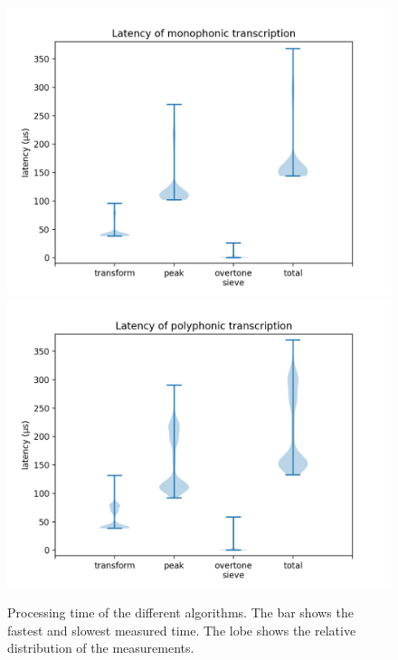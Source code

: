 \documentclass[10pt,twocolumn]{article}
\begin{document}
\begin{figure}[t]%
    \centering
    \includegraphics[width=\linewidth]{1.png}\vspace{+6mm} %
    \includegraphics[width=\linewidth]{2.png} %
    \caption{Processing time of the different algorithms. The bar shows the fastest and slowest measured time. The lobe shows the relative distribution of the measurements.}
    \label{fig:snel}
\end{figure}%
\end{document}
